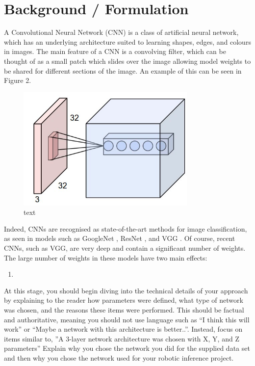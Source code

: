\documentclass[10pt,journal,compsoc]{IEEEtran}
\begin{document}
		\section{Background / Formulation}
		A Convolutional Neural Network (CNN) is a class of artificial neural network, which has an underlying architecture suited to learning shapes, edges, and colours in images. The main feature of a CNN is a convolving filter, which can be thought of as a small patch which slides over the image allowing model weights to be shared for different sections of the image. An example of this can be seen in Figure 2.\\
		\begin{figure}[h]
			\centering
			\includegraphics[scale=0.4]{CNN}
			\caption{text}
		\end{figure}
		
		Indeed, CNNs are recognised as state-of-the-art methods for image classification, as seen in models such as GoogleNet \cite{Szegedy:2014}, ResNet \cite{He:2015}, and VGG \cite{Simonyan:2015}. Of course, recent CNNs, such as VGG, are very deep and contain a significant number of weights. The large number of weights in these models have two main effects:
		\begin{enumerate}
			\item 
		\end{enumerate}
		
		
		
		At this stage, you should begin diving into the technical details of your approach by explaining to the reader how parameters were defined, what type of network was chosen, and the reasons these items were performed. This should be factual and authoritative, meaning you should not use language such as “I think this will work” or “Maybe a network with this architecture is better..”. Instead, focus on items similar to, ”A 3-layer network architecture was chosen with X, Y, and Z parameters” 
		Explain why you chose the network you did for the supplied data set and then why you chose the network used for your robotic inference project.
		
\end{document}
